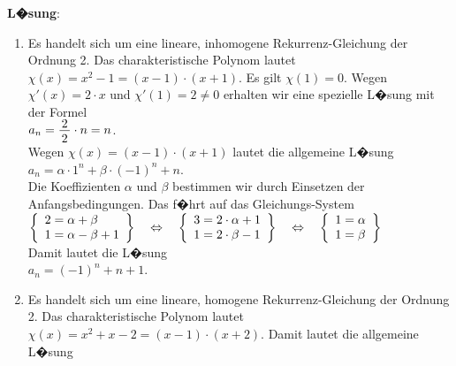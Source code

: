 \documentclass{article}
\newcommand{\bruch}[2]{\frac{\displaystyle \raisebox{1pt}[0pt][-0pt]{$\,#1\,$}}{\displaystyle \raisebox{0pt}[9pt]{$\,#2\,$}}}
\begin{document}
\noindent
\textbf{L�sung}:
\begin{enumerate}
\item Es handelt sich um eine lineare, inhomogene Rekurrenz-Gleichung der Ordnung 2.
      Das charakteristische Polynom lautet $\chi(x) = x^2 - 1 = (x-1)\cdot(x+1)$. 
      Es gilt $\chi(1) = 0$. Wegen $\chi'(x) = 2\cdot x$ und $\chi'(1) = 2 \not=0$ erhalten wir
      eine spezielle L�sung mit der Formel
      \\[0.2cm]
      \hspace*{1.3cm}
      $a_n = \bruch{2}{2} \cdot n = n$.
      \\[0.2cm]
      Wegen $\chi(x) = (x-1)\cdot (x+1)$ lautet
      die allgemeine L�sung 
      \\[0.2cm]
      \hspace*{1.3cm} $a_{n} = \alpha \cdot  1^n + \beta \cdot  (-1)^n + n$.
      \\[0.2cm]
      Die Koeffizienten $\alpha$ und $\beta$ bestimmen wir durch Einsetzen der
      Anfangsbedingungen. Das f�hrt auf das Gleichungs-System 
      \\[0.2cm]
      \hspace*{1.3cm}
      $
      \left\{\begin{array}[c]{lcl}
        2 = \alpha + \beta \\
        1 = \alpha - \beta + 1 \\
      \end{array}\right\} \quad \Leftrightarrow\quad
      \left\{\begin{array}[c]{lcl}
        3 = 2\cdot \alpha + 1 \\
        1 = 2\cdot \beta  - 1 \\
      \end{array}\right\} \quad \Leftrightarrow\quad
      \left\{\begin{array}[c]{lcl}
        1 = \alpha  \\
        1 = \beta \\
      \end{array}\right\} 
      $
      \\[0.2cm]
      Damit lautet die L�sung 
      \\[0.2cm]
      \hspace*{1.3cm} $a_n = (-1)^n + n + 1$.
\item Es handelt sich um eine lineare, homogene Rekurrenz-Gleichung der Ordnung 2.
      Das charakteristische Polynom lautet $\chi(x) = x^2 + x - 2 = (x-1)\cdot (x+2)$. 
      Damit lautet die allgemeine L�sung 

\end{enumerate}
\end{document}
